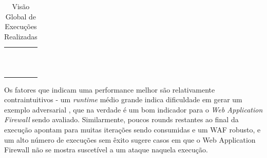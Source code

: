 \begin{table}[H]
\centering
\caption{Visão Global de Execuções Realizadas}
\begin{supertabular}{m{4.0cm}m{3.7cm}m{3.6cm}m{3.0cm}}
\hline
{} &
 &
 &
\centering{}\\\hline
{} &
 &
 &
\centering{}\\
 &
 &
 &
\centering{}\\
 &
 &
 &
\centering{}\\
 &
 &
 &
\centering{}\\
 &
 &
 &
\centering{}\\
 &
 &
 &
\centering{}\\
 &
 &
 &
\centering{}\\
 &
 &
 &
\centering{}\\
 &
 &
 &
\centering{}\\
 &
 &
 &
\centering{}\\
 &
 &
 &
\centering{}\\
\hline
\end{supertabular}
    \label{tab:tests}
\end{table}
\bigskip

Os fatores que indicam uma performance melhor são relativamente contraintuitivos - um \textit{runtime} médio grande indica dificuldade em gerar um exemplo adversarial \cite{adversarial_example}, que na verdade é um bom indicador para o \textit{Web Application Firewall} sendo avaliado. Similarmente, poucos rounds restantes ao final da execução apontam para muitas iterações sendo consumidas e um WAF robusto, e um alto número de execuções sem êxito sugere casos em que o Web Application Firewall não se mostra suscetível a um ataque naquela execução. 

